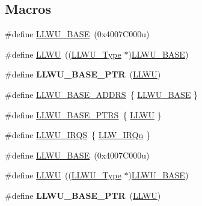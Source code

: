 \subsection*{Macros}
\begin{DoxyCompactItemize}
\item 
\#define \hyperlink{group__LLWU__Peripheral__Access__Layer_ga5596067d46debe317ac368bfc5db21f8}{L\+L\+W\+U\+\_\+\+B\+A\+SE}~(0x4007\+C000u)
\item 
\#define \hyperlink{group__LLWU__Peripheral__Access__Layer_gaed2d6ced03dff7739533096e53983dbe}{L\+L\+WU}~((\hyperlink{structLLWU__Type}{L\+L\+W\+U\+\_\+\+Type} $\ast$)\hyperlink{group__LLWU__Peripheral__Access__Layer_ga5596067d46debe317ac368bfc5db21f8}{L\+L\+W\+U\+\_\+\+B\+A\+SE})
\item 
\#define {\bfseries L\+L\+W\+U\+\_\+\+B\+A\+S\+E\+\_\+\+P\+TR}~(\hyperlink{group__LLWU__Peripheral__Access__Layer_gaed2d6ced03dff7739533096e53983dbe}{L\+L\+WU})\hypertarget{group__LLWU__Peripheral__Access__Layer_ga89c97b9e8756088cb3d8617c022ae6ac}{}\label{group__LLWU__Peripheral__Access__Layer_ga89c97b9e8756088cb3d8617c022ae6ac}

\item 
\#define \hyperlink{group__LLWU__Peripheral__Access__Layer_ga3d947ff94f2db32873659ceeeb8bc767}{L\+L\+W\+U\+\_\+\+B\+A\+S\+E\+\_\+\+A\+D\+D\+RS}~\{ \hyperlink{group__LLWU__Peripheral__Access__Layer_ga5596067d46debe317ac368bfc5db21f8}{L\+L\+W\+U\+\_\+\+B\+A\+SE} \}
\item 
\#define \hyperlink{group__LLWU__Peripheral__Access__Layer_ga4826d688973513cc02a2f1d4f67c336b}{L\+L\+W\+U\+\_\+\+B\+A\+S\+E\+\_\+\+P\+T\+RS}~\{ \hyperlink{group__LLWU__Peripheral__Access__Layer_gaed2d6ced03dff7739533096e53983dbe}{L\+L\+WU} \}
\item 
\#define \hyperlink{group__LLWU__Peripheral__Access__Layer_ga00f85a14dffe324ff8e867f8b06f1461}{L\+L\+W\+U\+\_\+\+I\+R\+QS}~\{ \hyperlink{group__Interrupt__vector__numbers_gga666eb0caeb12ec0e281415592ae89083a072e6f3fb1f5403cfb71eeaefe647a50}{L\+L\+W\+\_\+\+I\+R\+Qn} \}
\item 
\#define \hyperlink{group__LLWU__Peripheral__Access__Layer_ga5596067d46debe317ac368bfc5db21f8}{L\+L\+W\+U\+\_\+\+B\+A\+SE}~(0x4007\+C000u)
\item 
\#define \hyperlink{group__LLWU__Peripheral__Access__Layer_gaed2d6ced03dff7739533096e53983dbe}{L\+L\+WU}~((\hyperlink{structLLWU__Type}{L\+L\+W\+U\+\_\+\+Type} $\ast$)\hyperlink{group__LLWU__Peripheral__Access__Layer_ga5596067d46debe317ac368bfc5db21f8}{L\+L\+W\+U\+\_\+\+B\+A\+SE})
\item 
\#define {\bfseries L\+L\+W\+U\+\_\+\+B\+A\+S\+E\+\_\+\+P\+TR}~(\hyperlink{group__LLWU__Peripheral__Access__Layer_gaed2d6ced03dff7739533096e53983dbe}{L\+L\+WU})\hypertarget{group__LLWU__Peripheral__Access__Layer_ga89c97b9e8756088cb3d8617c022ae6ac}{}\label{group__LLWU__Peripheral__Access__Layer_ga89c97b9e8756088cb3d8617c022ae6ac}


\end{DoxyCompactItemize}
